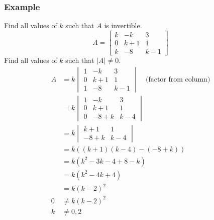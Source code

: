 \documentclass{math}
\begin{document}
\subsubsection*{Example}
Find all values of \( k \) such that \( A \) is invertible.
\[ A = \begin{bmatrix}k & -k & 3 \\ 0 & k+1 & 1 \\ k & -8 & k-1\end{bmatrix} \]
Find all values of \( k \) such that \( |A|\ne0 \).
\begin{align*}
  A &= k\begin{vmatrix}
    1 & -k & 3 \\
    0 & k+1 & 1 \\
    1 & -8 & k-1
  \end{vmatrix} \quad \text{(factor from column)}\\
  &= k\begin{vmatrix}
    1 & -k & 3 \\
    0 & k+1 & 1 \\
    0 & -8+k & k-4
  \end{vmatrix} \\
  &= k\begin{vmatrix}
    k+1 & 1 \\
    -8+k & k-4
  \end{vmatrix} \\
  &= k((k+1)(k-4)-(-8+k)) \\
  &= k(k^2-3k-4+8-k) \\
  &= k(k^2-4k+4) \\
  &= k(k-2)^2 \\
  0 &\ne k(k-2)^2 \\
  k &\ne 0,2
\end{align*}
\end{document}
